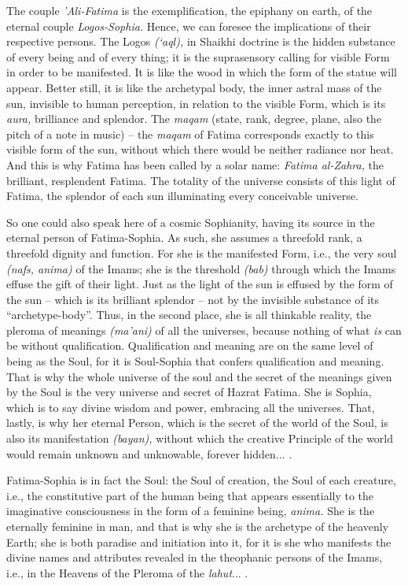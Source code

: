 \begin{quotationx}
The couple \emph{'Ali-Fatima} is the exemplification, the epiphany on earth, of the eternal couple \emph{Logos-Sophia.} Hence, we can foresee the implications of their respective persons. The Logos \emph{(`aql),} in Shaikhi doctrine is the hidden substance of every being and of every thing; it is the suprasensory calling for visible Form in order to be manifested. It is like the wood in which the form of the statue will appear. Better still, it is like the archetypal body, the inner astral mass of the sun, invisible to human perception, in relation to the visible Form, which is its \emph{aura,} brilliance and splendor. The \emph{maqam} (state, rank, degree, plane, also the pitch of a note in music) -- the \emph{maqam} of Fatima corresponds exactly to this visible form of the sun, without which there would be neither radiance nor heat. And this is why Fatima has been called by a solar name: \emph{Fatima al-Zahra,} the brilliant, resplendent Fatima. The totality of the universe consists of this light of Fatima, the splendor of each sun illuminating every conceivable universe.

So one could also speak here of a cosmic Sophianity, having its source in the eternal person of Fatima-Sophia. As such, she assumes a threefold rank, a threefold dignity and function. For she is the manifested Form, i.e., the very soul \emph{(nafs, anima)} of the Imams; she is the threshold \emph{(bab)} through which the Imams effuse the gift of their light. Just as the light of the sun is effused by the form of the sun -- which is its brilliant splendor -- not by the invisible substance of its ``archetype-body''. Thus, in the second place, she is all thinkable reality, the pleroma of meanings \emph{(ma'ani)} of all the universes, because nothing of what \emph{is} can be without qualification. Qualification and meaning are on the same level of being as the Soul, for it is Soul-Sophia that confers qualification and meaning. That is why the whole universe of the soul and the secret of the meanings given by the Soul is the very universe and secret of Hazrat Fatima. She is Sophia, which is to say divine wisdom and power, embracing all the universes. That, lastly, is why her eternal Person, which is the secret of the world of the Soul, is also its manifestation \emph{(bayan),} without which the creative Principle of the world would remain unknown and unknowable, forever hidden... .

Fatima-Sophia is in fact the Soul: the Soul of creation, the Soul of each creature, i.e., the constitutive part of the human being that appears essentially to the imaginative consciousness in the form of a feminine being, \emph{anima.} She is the eternally feminine in man, and that is why she is the archetype of the heavenly Earth; she is both paradise and initiation into it, for it is she who manifests the divine names and attributes revealed in the theophanic persons of the Imams, i.e., in the Heavens of the Pleroma of the \emph{lahut}... .


\end{quotationx}
